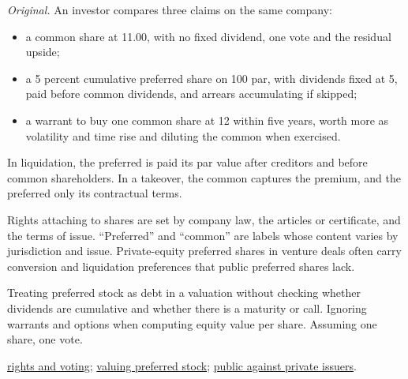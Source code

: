\begin{qfdefinition}
 \emph{Original.} An investor compares three claims on the same company:
\begin{itemize}
\item a common share at 11.00, with no fixed dividend, one vote and the residual upside;
\item a 5 percent cumulative preferred share on 100 par, with dividends fixed at 5, paid before common dividends, and arrears accumulating if skipped;
\item a warrant to buy one common share at 12 within five years, worth more as volatility and time rise and diluting the common when exercised.
\end{itemize}
In liquidation, the preferred is paid its par value after creditors and before common shareholders. In a takeover, the common captures the premium, and the preferred only its contractual terms.

 Rights attaching to shares are set by company law, the articles or certificate, and the terms of issue. ``Preferred'' and ``common'' are labels whose content varies by jurisdiction and issue. Private-equity preferred shares in venture deals often carry conversion and liquidation preferences that public preferred shares lack.

 Treating preferred stock as debt in a valuation without checking whether dividends are cumulative and whether there is a maturity or call. Ignoring warrants and options when computing equity value per share. Assuming one share, one vote.

 \hyperref[def:equity-rights-voting]{rights and voting}; \hyperref[meth:preferred-stock-valuation]{valuing preferred stock}; \hyperref[def:organisational-forms-issuers]{public against private issuers}.

\end{qfdefinition}

